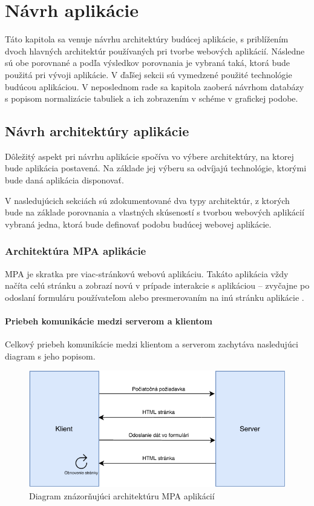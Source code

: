 \chapter{Návrh aplikácie}
Táto kapitola sa venuje návrhu architektúry budúcej aplikácie, s priblížením dvoch hlavných architektúr používaných pri tvorbe webových aplikácií. Následne sú obe porovnané a podľa výsledkov porovnania je vybraná taká, ktorá bude použitá pri vývoji aplikácie. V ďaľšej sekcii sú vymedzené použité technológie budúcou aplikáciou. V neposlednom rade sa kapitola zaoberá návrhom databázy s popisom normalizácie tabuliek a ich zobrazením v schéme v grafickej podobe.

\section{Návrh architektúry aplikácie}
Dôležitý aspekt pri návrhu aplikácie spočíva vo výbere architektúry, na ktorej bude aplikácia postavená. Na základe jej výberu sa odvíjajú technológie, ktorými bude daná aplikácia disponovať.

V nasledujúcich sekciách sú zdokumentované dva typy architektúr, z ktorých bude na základe porovnania a vlastných skúseností s tvorbou webových aplikácií vybraná jedna, ktorá bude definovať podobu budúcej webovej aplikácie.

\subsection{Architektúra MPA aplikácie}
MPA je skratka pre viac-stránkovú webovú aplikáciu. Takáto aplikácia vždy načíta celú stránku a zobrazí novú v prípade  interakcie s aplikáciou -- zvyčajne po odoslaní formuláru používateľom alebo presmerovaním na inú stránku aplikácie \cite{spa-vs-mpa-1}.

\subsubsection*{Priebeh komunikácie medzi serverom a klientom}
Celkový priebeh komunikácie medzi klientom a serverom zachytáva nasledujúci diagram s jeho popisom.

\begin{figure}[H]
	\includegraphics[width=1.0\textwidth]{media/navrh/MPA.pdf}
	\caption{Diagram znázorňujúci architektúru MPA aplikácií}\label{mpa-graf}
\end{figure}

